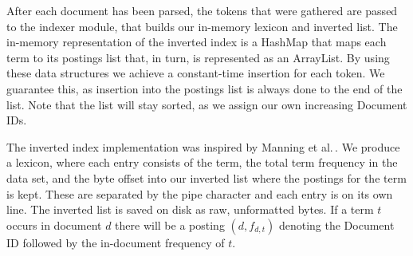 After each document has been parsed, the tokens that were gathered are passed to the indexer module, that builds our in-memory lexicon and inverted list. The in-memory representation of the inverted index is a HashMap that maps each term to its postings list that, in turn, is represented as an ArrayList. By using these data structures we achieve a constant-time insertion for each token. We guarantee this, as insertion into the postings list is always done to the end of the list. Note that the list will stay sorted, as we assign our own increasing Document IDs.

The inverted index implementation was inspired by Manning et al.\,\cite{manning2008introduction}. We produce a lexicon, where each entry consists of the term, the total term frequency in the data set, and the byte offset into our inverted list where the postings for the term is kept. These are separated by the pipe character and each entry is on its own line. The inverted list is saved on disk as raw, unformatted bytes. If a term $t$ occurs in document $d$ there will be a posting $(d, f_{d,t})$ denoting the Document ID followed by the in-document frequency of $t$.


